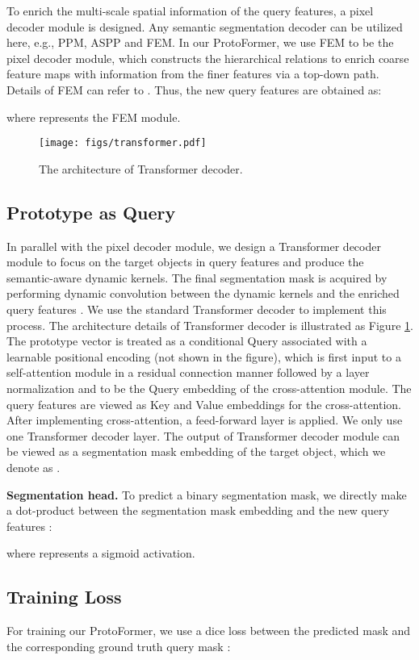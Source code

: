 \documentclass[journal]{IEEEtran}
\begin{document}
To enrich the multi-scale spatial information of the query features, a pixel decoder module is designed. Any semantic segmentation decoder can be utilized here, e.g., PPM\cite{pspnet}, ASPP\cite{deeplabv3} and FEM\cite{pfenet}. In our ProtoFormer, we use FEM to be the pixel decoder module, which constructs the hierarchical relations to enrich coarse feature maps with information from the finer features via a top-down path. Details of FEM can refer to \cite{pfenet}. Thus, the new query features are obtained as:

where  represents the FEM module.

\begin{figure}[t]
  \centering
  \texttt{[image: figs/transformer.pdf]}
  \caption{The architecture of Transformer decoder.}
  \label{fig:transformer}
\end{figure}

\subsection{Prototype as Query}
In parallel with the pixel decoder module, we design a Transformer decoder module to focus on the target objects in query features and produce the semantic-aware dynamic kernels. The final segmentation mask is acquired by performing dynamic convolution between the dynamic kernels and the enriched query features . We use the standard Transformer decoder to implement this process. The architecture details of Transformer decoder is illustrated as Figure \ref{fig:transformer}. The prototype vector  is treated as a conditional Query associated with a learnable positional encoding (not shown in the figure), which is first input to a self-attention module in a residual connection manner followed by a layer normalization and to be the Query embedding of the cross-attention module. The query features  are viewed as Key and Value embeddings for the cross-attention. After implementing cross-attention, a feed-forward layer is applied. We only use one Transformer decoder layer. The output of Transformer decoder module can be viewed as a segmentation mask embedding of the target object, which we denote as .

\noindent \textbf{Segmentation head.}
To predict a binary segmentation mask, we directly make a dot-product between the segmentation mask embedding  and the new query features :

where  represents a sigmoid activation.

\subsection{Training Loss}
For training our ProtoFormer, we use a dice loss between the predicted mask  and the corresponding ground truth query mask :
\end{document}

